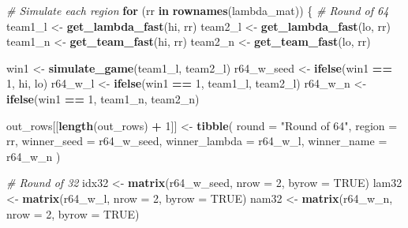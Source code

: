 \documentclass[
]{article}
\newenvironment{Shaded}{\begin{snugshade}}{\end{snugshade}}
\newcommand{\AttributeTok}[1]{\textcolor[rgb]{0.13,0.29,0.53}{#1}}
\newcommand{\CommentTok}[1]{\textcolor[rgb]{0.56,0.35,0.01}{\textit{#1}}}
\newcommand{\ConstantTok}[1]{\textcolor[rgb]{0.56,0.35,0.01}{#1}}
\newcommand{\ControlFlowTok}[1]{\textcolor[rgb]{0.13,0.29,0.53}{\textbf{#1}}}
\newcommand{\DecValTok}[1]{\textcolor[rgb]{0.00,0.00,0.81}{#1}}
\newcommand{\FunctionTok}[1]{\textcolor[rgb]{0.13,0.29,0.53}{\textbf{#1}}}
\newcommand{\NormalTok}[1]{#1}
\newcommand{\OtherTok}[1]{\textcolor[rgb]{0.56,0.35,0.01}{#1}}
\newcommand{\SpecialCharTok}[1]{\textcolor[rgb]{0.81,0.36,0.00}{\textbf{#1}}}
\newcommand{\StringTok}[1]{\textcolor[rgb]{0.31,0.60,0.02}{#1}}
\begin{document}
\begin{Shaded}
\begin{Highlighting}[]
    \CommentTok{\# Simulate each region}
    \ControlFlowTok{for}\NormalTok{ (rr }\ControlFlowTok{in} \FunctionTok{rownames}\NormalTok{(lambda\_mat)) \{}
        \CommentTok{\# Round of 64}
\NormalTok{        team1\_l }\OtherTok{\textless{}{-}} \FunctionTok{get\_lambda\_fast}\NormalTok{(hi, rr)}
\NormalTok{        team2\_l }\OtherTok{\textless{}{-}} \FunctionTok{get\_lambda\_fast}\NormalTok{(lo, rr)}
\NormalTok{        team1\_n }\OtherTok{\textless{}{-}} \FunctionTok{get\_team\_fast}\NormalTok{(hi, rr)}
\NormalTok{        team2\_n }\OtherTok{\textless{}{-}} \FunctionTok{get\_team\_fast}\NormalTok{(lo, rr)}

\NormalTok{        win1 }\OtherTok{\textless{}{-}} \FunctionTok{simulate\_game}\NormalTok{(team1\_l, team2\_l)}
\NormalTok{        r64\_w\_seed }\OtherTok{\textless{}{-}} \FunctionTok{ifelse}\NormalTok{(win1 }\SpecialCharTok{==} \DecValTok{1}\NormalTok{, hi, lo)}
\NormalTok{        r64\_w\_l }\OtherTok{\textless{}{-}} \FunctionTok{ifelse}\NormalTok{(win1 }\SpecialCharTok{==} \DecValTok{1}\NormalTok{, team1\_l, team2\_l)}
\NormalTok{        r64\_w\_n }\OtherTok{\textless{}{-}} \FunctionTok{ifelse}\NormalTok{(win1 }\SpecialCharTok{==} \DecValTok{1}\NormalTok{, team1\_n, team2\_n)}

\NormalTok{        out\_rows[[}\FunctionTok{length}\NormalTok{(out\_rows) }\SpecialCharTok{+} \DecValTok{1}\NormalTok{]] }\OtherTok{\textless{}{-}} \FunctionTok{tibble}\NormalTok{(}
            \AttributeTok{round =} \StringTok{"Round of 64"}\NormalTok{, }\AttributeTok{region =}\NormalTok{ rr,}
            \AttributeTok{winner\_seed =}\NormalTok{ r64\_w\_seed, }\AttributeTok{winner\_lambda =}\NormalTok{ r64\_w\_l, }\AttributeTok{winner\_name =}\NormalTok{ r64\_w\_n}
\NormalTok{        )}

        \CommentTok{\# Round of 32}
\NormalTok{        idx32 }\OtherTok{\textless{}{-}} \FunctionTok{matrix}\NormalTok{(r64\_w\_seed, }\AttributeTok{nrow =} \DecValTok{2}\NormalTok{, }\AttributeTok{byrow =} \ConstantTok{TRUE}\NormalTok{)}
\NormalTok{        lam32 }\OtherTok{\textless{}{-}} \FunctionTok{matrix}\NormalTok{(r64\_w\_l, }\AttributeTok{nrow =} \DecValTok{2}\NormalTok{, }\AttributeTok{byrow =} \ConstantTok{TRUE}\NormalTok{)}
\NormalTok{        nam32 }\OtherTok{\textless{}{-}} \FunctionTok{matrix}\NormalTok{(r64\_w\_n, }\AttributeTok{nrow =} \DecValTok{2}\NormalTok{, }\AttributeTok{byrow =} \ConstantTok{TRUE}\NormalTok{)}


\end{Highlighting}
\end{Shaded}
\end{document}
